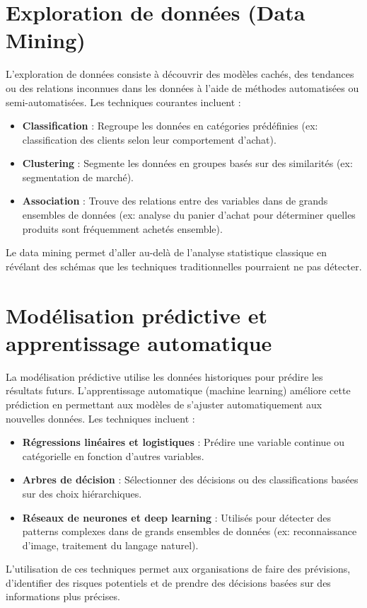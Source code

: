 \documentclass[a4paper,12pt]{report}
\begin{document}
\section{Exploration de données (Data Mining)}
L'exploration de données consiste à découvrir des modèles cachés, des tendances ou des relations inconnues dans les données à l'aide de méthodes automatisées ou semi-automatisées. Les techniques courantes incluent :
\begin{itemize}
    \item \textbf{Classification} : Regroupe les données en catégories prédéfinies (ex: classification des clients selon leur comportement d'achat).
    \item \textbf{Clustering} : Segmente les données en groupes basés sur des similarités (ex: segmentation de marché).
    \item \textbf{Association} : Trouve des relations entre des variables dans de grands ensembles de données (ex: analyse du panier d'achat pour déterminer quelles produits sont fréquemment achetés ensemble).
\end{itemize}
Le data mining permet d'aller au-delà de l'analyse statistique classique en révélant des schémas que les techniques traditionnelles pourraient ne pas détecter.

\section{Modélisation prédictive et apprentissage automatique}
La modélisation prédictive utilise les données historiques pour prédire les résultats futurs. L'apprentissage automatique (machine learning) améliore cette prédiction en permettant aux modèles de s'ajuster automatiquement aux nouvelles données. Les techniques incluent :
\begin{itemize}
    \item \textbf{Régressions linéaires et logistiques} : Prédire une variable continue ou catégorielle en fonction d'autres variables.
    \item \textbf{Arbres de décision} : Sélectionner des décisions ou des classifications basées sur des choix hiérarchiques.
    \item \textbf{Réseaux de neurones et deep learning} : Utilisés pour détecter des patterns complexes dans de grands ensembles de données (ex: reconnaissance d'image, traitement du langage naturel).
\end{itemize}
L'utilisation de ces techniques permet aux organisations de faire des prévisions, d'identifier des risques potentiels et de prendre des décisions basées sur des informations plus précises.
\end{document}
